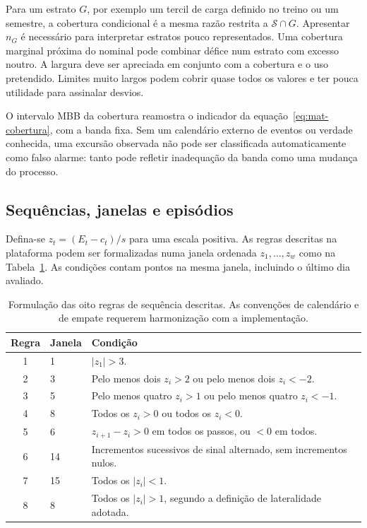 Para um estrato $G$, por exemplo um tercil de carga definido no treino ou um semestre, a cobertura condicional é a mesma razão restrita a $\mathcal S\cap G$. Apresentar $n_G$ é necessário para interpretar estratos pouco representados. Uma cobertura marginal próxima do nominal pode combinar défice num estrato com excesso noutro. A largura deve ser apreciada em conjunto com a cobertura e o uso pretendido\parencite{Gneiting2007}. Limites muito largos podem cobrir quase todos os valores e ter pouca utilidade para assinalar desvios.

O intervalo MBB da cobertura reamostra o indicador da equação~\ref{eq:mat-cobertura}, com a banda fixa. Sem um calendário externo de eventos ou verdade conhecida, uma excursão observada não pode ser classificada automaticamente como falso alarme: tanto pode refletir inadequação da banda como uma mudança do processo.

\subsection{Sequências, janelas e episódios}
\label{sec:mat-regras}
Defina-se $z_t=(E_t-c_t)/s$ para uma escala positiva. As regras descritas na plataforma podem ser formalizadas numa janela ordenada $z_1,\ldots,z_w$ como na Tabela~\ref{tab:mat-regras}. As condições contam pontos na mesma janela, incluindo o último dia avaliado.

\begin{table}[htbp]
\centering\small
\caption{Formulação das oito regras de sequência descritas. As convenções de calendário e de empate requerem harmonização com a implementação.}
\label{tab:mat-regras}
\begin{tabularx}{\linewidth}{@{}clX@{}}\toprule
Regra & Janela & Condição\\\midrule
1 & 1 & $|z_1|>3$.\\
2 & 3 & Pelo menos dois $z_i>2$ ou pelo menos dois $z_i<-2$.\\
3 & 5 & Pelo menos quatro $z_i>1$ ou pelo menos quatro $z_i<-1$.\\
4 & 8 & Todos os $z_i>0$ ou todos os $z_i<0$.\\
5 & 6 & $z_{i+1}-z_i>0$ em todos os passos, ou $<0$ em todos.\\
6 & 14 & Incrementos sucessivos de sinal alternado, sem incrementos nulos.\\
7 & 15 & Todos os $|z_i|<1$.\\
8 & 8 & Todos os $|z_i|>1$, segundo a definição de lateralidade adotada.\\\bottomrule
\end{tabularx}
\end{table}

